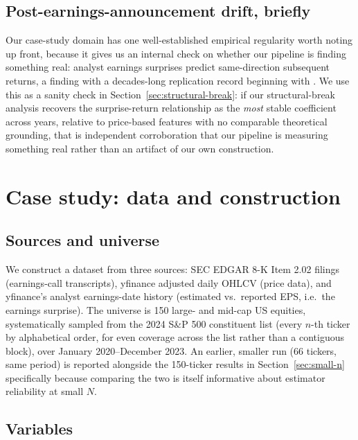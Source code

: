 \documentclass[11pt]{article}
\begin{document}
\subsection{Post-earnings-announcement drift, briefly}

Our case-study domain has one well-established empirical regularity worth noting up front, because it gives us an internal check on whether our pipeline is finding something real: analyst earnings surprises predict same-direction subsequent returns, a finding with a decades-long replication record beginning with \citet{bernard1989postearnings}. We use this as a sanity check in Section~\ref{sec:structural-break}: if our structural-break analysis recovers the surprise-return relationship as the \emph{most} stable coefficient across years, relative to price-based features with no comparable theoretical grounding, that is independent corroboration that our pipeline is measuring something real rather than an artifact of our own construction.

\section{Case study: data and construction}

\subsection{Sources and universe}

We construct a dataset from three sources: SEC EDGAR 8-K Item 2.02 filings (earnings-call transcripts), yfinance adjusted daily OHLCV (price data), and yfinance's analyst earnings-date history (estimated vs.\ reported EPS, i.e.\ the earnings surprise). The universe is 150 large- and mid-cap US equities, systematically sampled from the 2024 S\&P 500 constituent list (every $n$-th ticker by alphabetical order, for even coverage across the list rather than a contiguous block), over January 2020--December 2023. An earlier, smaller run (66 tickers, same period) is reported alongside the 150-ticker results in Section~\ref{sec:small-n} specifically because comparing the two is itself informative about estimator reliability at small $N$.

\subsection{Variables}
\end{document}
